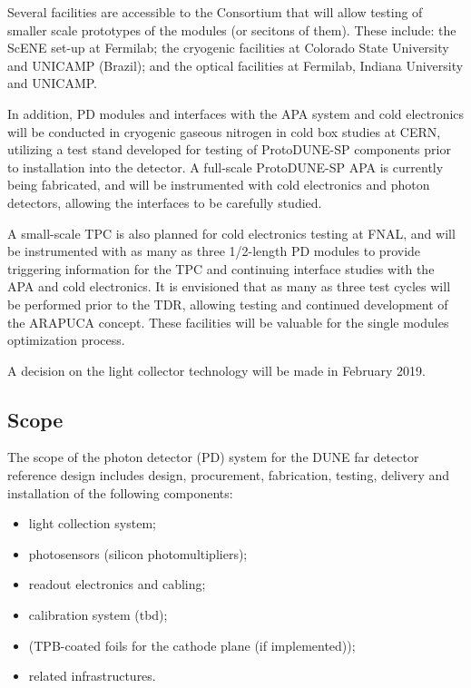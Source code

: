 

Several facilities are accessible to the Consortium that will allow testing of smaller scale prototypes of the modules (or secitons of them). These include: the 
ScENE set-up at Fermilab; the cryogenic facilities at Colorado State University and UNICAMP (Brazil); and the optical facilities at Fermilab, 
Indiana University and UNICAMP.


In addition, PD modules and interfaces with the APA system and cold electronics will be conducted in cryogenic gaseous nitrogen in cold box studies at CERN, utilizing a test stand developed for testing of ProtoDUNE-SP components prior to installation into the detector.  A full-scale ProtoDUNE-SP APA is currently being fabricated, and will be instrumented with cold electronics and photon detectors, allowing the interfaces to be carefully studied.

A small-scale TPC is also planned for cold electronics testing at FNAL, and will be instrumented with as many as three 1/2-length PD modules to provide triggering information for the TPC and continuing interface studies with the APA and cold electronics.  It is envisioned that as many as three test cycles will be performed prior to the TDR, allowing testing and continued development of the ARAPUCA concept.
These facilities will be valuable for the single modules optimization process.

A decision on the light collector technology will be made in February 2019.

\subsection{Scope}
\label{sec:fdsp-pd-scope}
The scope of the photon detector (PD) system for the DUNE far detector 
reference design includes design, procurement, fabrication, testing,
 delivery and installation of the following components:
\begin{itemize}
        \item light collection system;
        \item photosensors (silicon photomultipliers);
        \item readout electronics and cabling;
        \item calibration system (tbd);
        \item (TPB-coated foils for the cathode plane (if implemented));
        \item related infrastructures.
\end{itemize}
